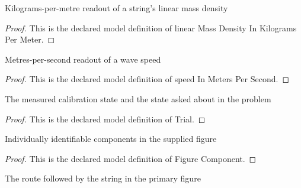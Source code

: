 \begin{definition}
  \label{def:physics:phyx-mini-0241:phyxminiproblems-problemphyxmini0241-linearmassdensityinkilogramspermeter}
  Kilograms-per-metre readout of a string's linear mass density
\end{definition}
\begin{proof}
  This is the declared model definition of linear Mass Density In Kilograms Per Meter.
\end{proof}
\begin{definition}
  \label{def:physics:phyx-mini-0241:phyxminiproblems-problemphyxmini0241-speedinmeterspersecond}
  Metres-per-second readout of a wave speed
\end{definition}
\begin{proof}
  This is the declared model definition of speed In Meters Per Second.
\end{proof}
\begin{definition}[Trial]
  \label{def:physics:phyx-mini-0241:phyxminiproblems-problemphyxmini0241-trial}
  The measured calibration state and the state asked about in the problem
\end{definition}
\begin{proof}
  This is the declared model definition of Trial.
\end{proof}
\begin{definition}
  \label{def:physics:phyx-mini-0241:phyxminiproblems-problemphyxmini0241-figurecomponent}
  Individually identifiable components in the supplied figure
\end{definition}
\begin{proof}
  This is the declared model definition of Figure Component.
\end{proof}
\begin{definition}
  \label{def:physics:phyx-mini-0241:phyxminiproblems-problemphyxmini0241-stringroute}
  The route followed by the string in the primary figure
\end{definition}
